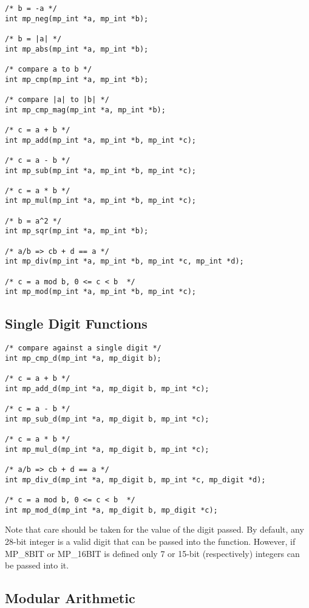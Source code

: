 \documentclass{article}
\begin{document}
\begin{verbatim}
/* b = -a */
int mp_neg(mp_int *a, mp_int *b);

/* b = |a| */
int mp_abs(mp_int *a, mp_int *b);

/* compare a to b */
int mp_cmp(mp_int *a, mp_int *b);

/* compare |a| to |b| */
int mp_cmp_mag(mp_int *a, mp_int *b);

/* c = a + b */
int mp_add(mp_int *a, mp_int *b, mp_int *c);

/* c = a - b */
int mp_sub(mp_int *a, mp_int *b, mp_int *c);

/* c = a * b */
int mp_mul(mp_int *a, mp_int *b, mp_int *c);

/* b = a^2 */
int mp_sqr(mp_int *a, mp_int *b);

/* a/b => cb + d == a */
int mp_div(mp_int *a, mp_int *b, mp_int *c, mp_int *d);

/* c = a mod b, 0 <= c < b  */
int mp_mod(mp_int *a, mp_int *b, mp_int *c);
\end{verbatim}

\subsection{Single Digit Functions}

\begin{verbatim}
/* compare against a single digit */
int mp_cmp_d(mp_int *a, mp_digit b);

/* c = a + b */
int mp_add_d(mp_int *a, mp_digit b, mp_int *c);

/* c = a - b */
int mp_sub_d(mp_int *a, mp_digit b, mp_int *c);

/* c = a * b */
int mp_mul_d(mp_int *a, mp_digit b, mp_int *c);

/* a/b => cb + d == a */
int mp_div_d(mp_int *a, mp_digit b, mp_int *c, mp_digit *d);

/* c = a mod b, 0 <= c < b  */
int mp_mod_d(mp_int *a, mp_digit b, mp_digit *c);
\end{verbatim}

Note that care should be taken for the value of the digit passed.  By default, any 28-bit integer is a valid digit that can
be passed into the function.  However, if MP\_8BIT or MP\_16BIT is defined only 7 or 15-bit (respectively) integers 
can be passed into it.

\subsection{Modular Arithmetic}
\end{document}
